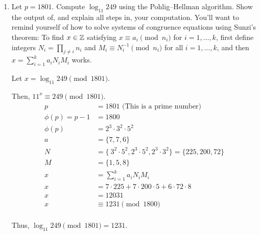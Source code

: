 \begin{problem}
\begin{enumerate}
    \newpage
    \item Let $p = 1801$.  Compute $\log_{11} 249$ using the
    Pohlig--Hellman algorithm.  Show the output of, and explain all steps
    in, your computation.  You'll want to remind yourself of how to solve
    systems of congruence equations using Sunzi's theorem: To find $x \in
    \mathbb{Z}$ satisfying $x \equiv a_i \pmod {n_i}$ for $i=1,\dotsc,k$, first
    define integers $N_i = \prod_{j\neq i} n_i$ and $M_i \equiv N_i^{-1}
    \pmod {n_i}$ for all $i = 1,\dotsc,k$, and then $x = \sum_{i=1}^k a_i
    N_i M_i$ works.
    \newline
    \begin{Answer}
      Let $x = \log_{11} 249 \pmod{1801}$.

      \noindent
      Then, $11^x \equiv 249 \pmod{1801}$.
      \begin{align*}
        p &= 1801 \text{      (This is a prime number)}\\
        \phi(p) = p - 1 &= 1800\\
        \phi(p) &= 2^3 \cdot 3^2 \cdot 5^2\\
        a &= \{ 7, 7, 6 \}\\
        N &= \{\ 3^2 \cdot 5^2, 2^3 \cdot 5^2, 2^3 \cdot 3^2\} = \{225, 200, 72\}\\
        M &= \{ 1, 5, 8 \}\\
        x &= \sum_{i=1}^k a_i N_i M_i \\
        x &= 7 \cdot 225 + 7 \cdot 200 \cdot 5 + 6 \cdot 72 \cdot 8\\
        x &= 12031\\
        x &\equiv 1231 \pmod{1800}\\
      \end{align*}
      
      \noindent
      Thus, $\log_{11} 249 \pmod{1801} = 1231$.
    \end{Answer}
  \end{enumerate}
\end{problem}
